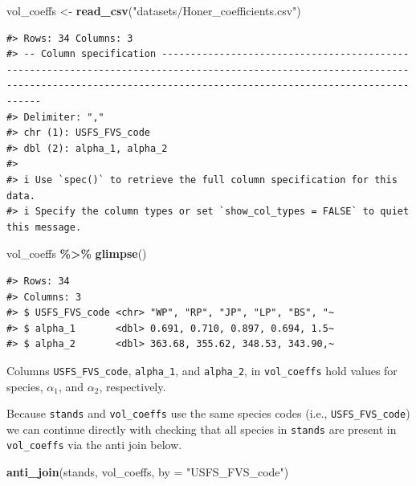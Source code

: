 \documentclass[
  11pt,
]{krantz}
\newenvironment{Shaded}{\begin{snugshade}}{\end{snugshade}}
\newcommand{\DataTypeTok}[1]{\textcolor[rgb]{0.13,0.29,0.53}{#1}}
\newcommand{\KeywordTok}[1]{\textcolor[rgb]{0.13,0.29,0.53}{\textbf{#1}}}
\newcommand{\NormalTok}[1]{#1}
\newcommand{\OperatorTok}[1]{\textcolor[rgb]{0.81,0.36,0.00}{\textbf{#1}}}
\newcommand{\StringTok}[1]{\textcolor[rgb]{0.31,0.60,0.02}{#1}}
\theoremstyle{definition}
\theoremstyle{definition}
\theoremstyle{definition}
\theoremstyle{definition}
\theoremstyle{remark}
\begin{document}
\begin{Shaded}
\begin{Highlighting}[]
\NormalTok{vol\_coeffs \textless{}{-}}\StringTok{ }\KeywordTok{read\_csv}\NormalTok{(}\StringTok{"datasets/Honer\_coefficients.csv"}\NormalTok{)}
\end{Highlighting}
\end{Shaded}

\begin{verbatim}
#> Rows: 34 Columns: 3
#> -- Column specification ---------------------------------------------------------------------------------------------------------------------------------------------------------------------------------------------
#> Delimiter: ","
#> chr (1): USFS_FVS_code
#> dbl (2): alpha_1, alpha_2
#> 
#> i Use `spec()` to retrieve the full column specification for this data.
#> i Specify the column types or set `show_col_types = FALSE` to quiet this message.
\end{verbatim}

\begin{Shaded}
\begin{Highlighting}[]
\NormalTok{vol\_coeffs }\OperatorTok{\%\textgreater{}\%}\StringTok{ }\KeywordTok{glimpse}\NormalTok{()}
\end{Highlighting}
\end{Shaded}

\begin{verbatim}
#> Rows: 34
#> Columns: 3
#> $ USFS_FVS_code <chr> "WP", "RP", "JP", "LP", "BS", "~
#> $ alpha_1       <dbl> 0.691, 0.710, 0.897, 0.694, 1.5~
#> $ alpha_2       <dbl> 363.68, 355.62, 348.53, 343.90,~
\end{verbatim}

Columns \texttt{USFS\_FVS\_code}, \texttt{alpha\_1}, and \texttt{alpha\_2}, in \texttt{vol\_coeffs} hold values for species, \(\alpha_1\), and \(\alpha_2\), respectively.

Because \texttt{stands} and \texttt{vol\_coeffs} use the same species codes (i.e., \texttt{USFS\_FVS\_code}) we can continue directly with checking that all species in \texttt{stands} are present in \texttt{vol\_coeffs} via the anti join below.

\begin{Shaded}
\begin{Highlighting}[]
\KeywordTok{anti\_join}\NormalTok{(stands, vol\_coeffs, }\DataTypeTok{by =} \StringTok{"USFS\_FVS\_code"}\NormalTok{)}
\end{Highlighting}
\end{Shaded}
\end{document}
